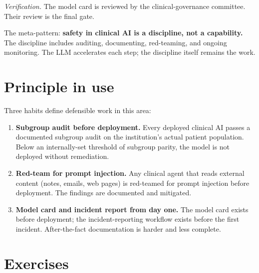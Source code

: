 \documentclass[
  letterpaper,
  11pt]{scrbook}
\begin{document}
\emph{Verification.} The model card is reviewed by the
clinical-governance committee. Their review is the final gate.

The meta-pattern: \textbf{safety in clinical AI is a discipline, not a
capability.} The discipline includes auditing, documenting, red-teaming,
and ongoing monitoring. The LLM accelerates each step; the discipline
itself remains the work.

\section{Principle in use}\label{principle-in-use-10}

Three habits define defensible work in this area:

\begin{enumerate}
\def\labelenumi{\arabic{enumi}.}
\item
  \textbf{Subgroup audit before deployment.} Every deployed clinical AI
  passes a documented subgroup audit on the institution's actual patient
  population. Below an internally-set threshold of subgroup parity, the
  model is not deployed without remediation.
\item
  \textbf{Red-team for prompt injection.} Any clinical agent that reads
  external content (notes, emails, web pages) is red-teamed for prompt
  injection before deployment. The findings are documented and
  mitigated.
\item
  \textbf{Model card and incident report from day one.} The model card
  exists before deployment; the incident-reporting workflow exists
  before the first incident. After-the-fact documentation is harder and
  less complete.
\end{enumerate}

\section{Exercises}\label{exercises-10}
\end{document}
